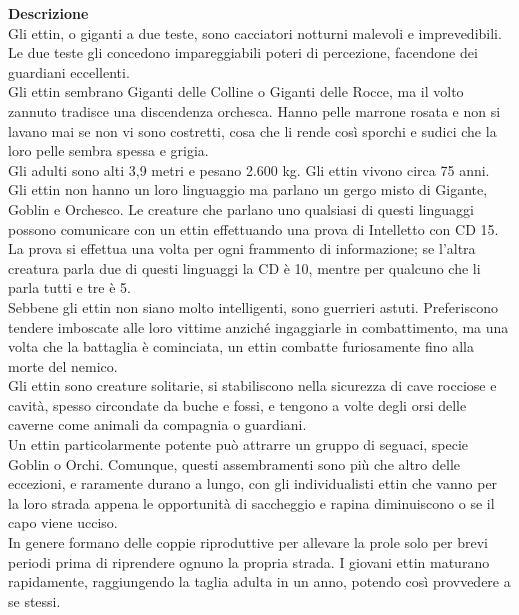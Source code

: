 \begin{multicols}{2}
\textbf{Descrizione}\\
Gli ettin, o giganti a due teste, sono cacciatori notturni malevoli e imprevedibili. Le due teste gli concedono impareggiabili poteri di percezione, facendone dei guardiani eccellenti.\\
Gli ettin sembrano Giganti delle Colline o Giganti delle Rocce, ma il volto zannuto tradisce una discendenza orchesca. Hanno pelle marrone rosata e non si lavano mai se non vi sono costretti, cosa che li rende così sporchi e sudici che la loro pelle sembra spessa e grigia.\\
Gli adulti sono alti 3,9 metri e pesano 2.600 kg. Gli ettin vivono circa 75 anni.\\
Gli ettin non hanno un loro linguaggio ma parlano un gergo misto di Gigante, Goblin e Orchesco. Le creature che parlano uno qualsiasi di questi linguaggi possono comunicare con un ettin effettuando una prova di Intelletto con CD 15. La prova si effettua una volta per ogni frammento di informazione; se l’altra creatura parla due di questi linguaggi la CD è 10, mentre per qualcuno che li parla tutti e tre è 5.\\
Sebbene gli ettin non siano molto intelligenti, sono guerrieri astuti. Preferiscono tendere imboscate alle loro vittime anziché ingaggiarle in combattimento, ma una volta che la battaglia è cominciata, un ettin combatte furiosamente fino alla morte del nemico.\\
Gli ettin sono creature solitarie, si stabiliscono nella sicurezza di cave rocciose e cavità, spesso circondate da buche e fossi, e tengono a volte degli orsi delle caverne come animali da compagnia o guardiani.\\
Un ettin particolarmente potente può attrarre un gruppo di seguaci, specie Goblin o Orchi. Comunque, questi assembramenti sono più che altro delle eccezioni, e raramente durano a lungo, con gli individualisti ettin che vanno per la loro strada appena le opportunità di saccheggio e rapina diminuiscono o se il capo viene ucciso.\\
In genere formano delle coppie riproduttive per allevare la prole solo per brevi periodi prima di riprendere ognuno la propria strada. I giovani ettin maturano rapidamente, raggiungendo la taglia adulta in un anno, potendo così provvedere a se stessi.\\


\end{multicols}
